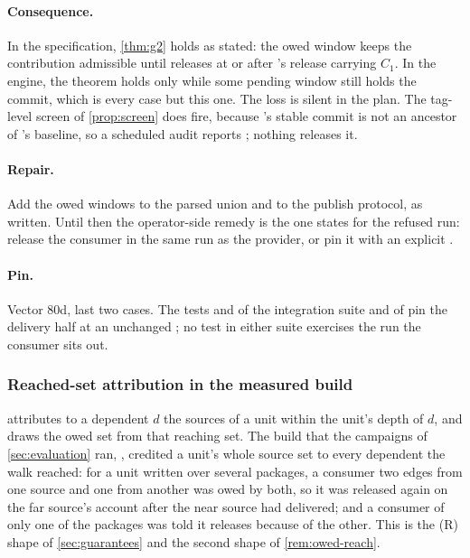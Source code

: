 \paragraph{Consequence.} In the specification, \cref{thm:g2} holds as
stated: the owed window keeps the contribution admissible until 
releases at or after 's release carrying $C_1$. In the engine, the
theorem holds only while some pending window still holds the commit, which
is every case but this one. The loss is silent in the plan. The tag-level
screen of \cref{prop:screen} does fire, because 's stable commit
is not an ancestor of 's baseline, so a scheduled 
audit reports ; nothing releases it.

\paragraph{Repair.} Add the owed windows to the parsed union and 
to the publish protocol, as written. Until then the operator-side remedy is
the one  states for the refused run: release the consumer in the
same run as the provider, or pin it with an explicit .

\paragraph{Pin.} Vector 80d, last two cases. The tests
 and
 of the
integration suite and
 of
 pin the delivery half at an unchanged \Head{}; no test
in either suite exercises the run the consumer sits out.

\subsubsection{Reached-set attribution in the measured build}

\begin{obligation}
\label{ob:attribution}
 attributes to a dependent $d$ the sources of a unit within the
unit's depth of $d$, and  draws the owed set from that reaching
set. The build that the campaigns of \cref{sec:evaluation} ran,
, credited a unit's whole source set to every
dependent the walk reached: for a unit written over several packages, a
consumer two edges from one source and one from another was owed by both,
so it was released again on the far source's account after the near source
had delivered; and a consumer of only one of the packages was told it
releases because of the other. This is the (R) shape of
\cref{sec:guarantees} and the second shape of \cref{rem:owed-reach}.
\end{obligation}


